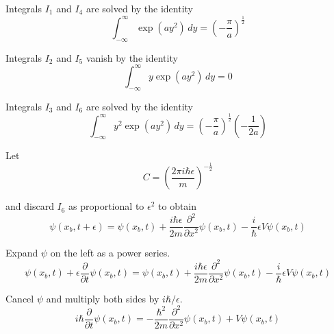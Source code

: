 Integrals $I_1$ and $I_4$ are solved by the identity
\begin{equation*}
\int_{-\infty}^\infty\exp(ay^2)\,dy=\left(-\frac{\pi}{a}\right)^\frac{1}{2}
\end{equation*}

Integrals $I_2$ and $I_5$ vanish by the identity
\begin{equation*}
\int_{-\infty}^\infty y\exp(ay^2)\,dy=0
\end{equation*}

Integrals $I_3$ and $I_6$ are solved by the identity
\begin{equation*}
\int_{-\infty}^\infty y^2\exp(ay^2)\,dy=\left(-\frac{\pi}{a}\right)^\frac{1}{2}\left(-\frac{1}{2a}\right)
\end{equation*}

Let
\begin{equation*}
C=\left(\frac{2\pi i\hbar\epsilon}{m}\right)^{-\frac{1}{2}}
\end{equation*}

and discard $I_6$ as proportional to $\epsilon^2$ to obtain
\begin{equation*}
\psi(x_b,t+\epsilon)=\psi(x_b,t)
+\frac{i\hbar\epsilon}{2m}\frac{\partial^2}{\partial x^2}\psi(x_b,t)
-\frac{i}{\hbar}\epsilon V\psi(x_b,t)
\end{equation*}

Expand $\psi$ on the left as a power series.
\begin{equation*}
\psi(x_b,t)+\epsilon\frac{\partial}{\partial t}\psi(x_b,t)=\psi(x_b,t)
+\frac{i\hbar\epsilon}{2m}\frac{\partial^2}{\partial x^2}\psi(x_b,t)
-\frac{i}{\hbar}\epsilon V\psi(x_b,t)
\end{equation*}

Cancel $\psi$ and multiply both sides by $i\hbar/\epsilon$.
\begin{equation*}
i\hbar\frac{\partial}{\partial t}\psi(x_b,t)
=-\frac{\hbar^2}{2m}\frac{\partial^2}{\partial x^2}\psi(x_b,t)+V\psi(x_b,t)
\end{equation*}




